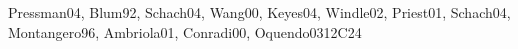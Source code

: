 \begin{syllabus}
\begin{unit}{\SESoftwareProjectManagement}{}{Pressman04, Blum92, Schach04, Wang00, Keyes04, Windle02, Priest01, Schach04, Montangero96, Ambriola01, Conradi00, Oquendo03}{12}{C24}
    \begin{topics}%
    \item \SESoftwareProjectManagementTopicTeam
    \item \SESoftwareProjectManagementTopicEffort
    \item \SESoftwareProjectManagementTopicRisk
    \item \SESoftwareProjectManagementTopicTeamManagement
    \item \SESoftwareProjectManagementTopicProject
    \item \SESoftwareProjectManagementTopicSoftwareMeasurement
    \item \SESoftwareProjectManagementTopicSoftwareQuality
    \item \SESoftwareProjectManagementTopicRiskS
    \item \SESoftwareProjectManagementTopicSystem
\end{topics}
\begin{learningoutcomes}
    \item \SESoftwareProjectManagementLODiscussCommon[\Usage]
    \item \SESoftwareProjectManagementLOCreateAndAgenda[\Usage]
    \item \SESoftwareProjectManagementLOIdentifyAndRoles[\Usage]
    \item \SESoftwareProjectManagementLOUnderstandTheAnd[\Usage]
    \item \SESoftwareProjectManagementLOApplyAStrategy[\Usage]
    \item \SESoftwareProjectManagementLOUseAn[\Usage]
    \item \SESoftwareProjectManagementLOListSeveral[\Usage]
    \item \SESoftwareProjectManagementLODescribeTheRiskSoftware[\Usage]
    \item \SESoftwareProjectManagementLODescribeDifferent[\Usage]
    \item \SESoftwareProjectManagementLODemonstrateThrough[\Usage]
\end{learningoutcomes}
\end{unit}



\begin{coursebibliography}
\end{coursebibliography}

\end{syllabus}
